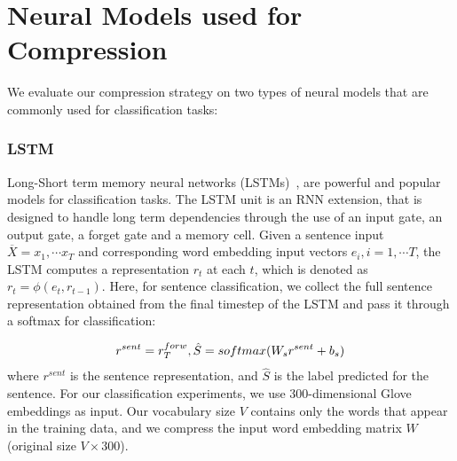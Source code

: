 \section{Neural Models used for Compression}

We evaluate our compression strategy on two types of neural models that are commonly used for classification tasks:


\subsubsection{LSTM}
Long-Short term memory neural networks (LSTMs)~\cite{hochreiter_lstm}, are powerful and popular models for classification tasks. The LSTM unit is an RNN extension, that is designed to handle long term dependencies through the use of an input gate, an output gate, a forget gate and a memory cell. Given a sentence input $\overline{X}=x_1, \cdots x_T $ and corresponding word embedding input vectors $e_i, i=1, \cdots T$, the LSTM computes a representation $r_t$ at each $t$, which is denoted as $r_t = \phi ( e_t ,r_{t-1} )$. Here, for sentence classification, we collect the full sentence representation obtained from the final timestep of the LSTM and pass it through a softmax for classification:

\begin{gather}
r^{sent} = r^{forw}_{T}, \space  
\hat{S}=softmax( W_{s} r^{sent} + b_{s})
\end{gather}
where $r^{sent}$ is the sentence representation, and $\hat{S}$ is the label predicted for the sentence. For our classification experiments, we use 300-dimensional Glove ~\cite{pennington2014glove} embeddings as input. Our vocabulary size $V$ contains only the words that appear in the training data, and we compress the input word embedding matrix $W$ (original size $V \times 300$).

